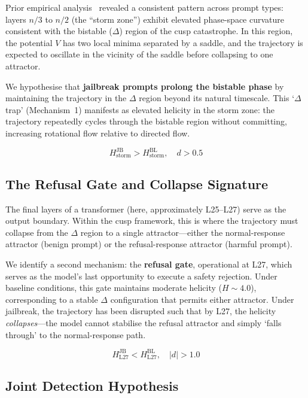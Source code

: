 \documentclass[12pt,a4paper]{article}
\begin{document}
Prior empirical analysis~\cite{DR_MM_2025b} revealed a consistent pattern across prompt types: layers $n/3$ to $n/2$ (the ``storm zone'') exhibit elevated phase-space curvature consistent with the bistable ($\Delta$) region of the cusp catastrophe. In this region, the potential $V$ has two local minima separated by a saddle, and the trajectory is expected to oscillate in the vicinity of the saddle before collapsing to one attractor.

We hypothesise that \textbf{jailbreak prompts prolong the bistable phase} by maintaining the trajectory in the $\Delta$ region beyond its natural timescale. This `$\Delta$ trap' (Mechanism~1) manifests as elevated helicity in the storm zone: the trajectory repeatedly cycles through the bistable region without committing, increasing rotational flow relative to directed flow.

\begin{equation}
    H_{\text{storm}}^{\text{JB}} > H_{\text{storm}}^{\text{BL}}, \quad d > 0.5
    \label{eq:storm}
\end{equation}

\subsection{The Refusal Gate and Collapse Signature}

The final layers of a transformer (here, approximately L25--L27) serve as the output boundary. Within the cusp framework, this is where the trajectory must collapse from the $\Delta$ region to a single attractor---either the normal-response attractor (benign prompt) or the refusal-response attractor (harmful prompt).

We identify a second mechanism: the \textbf{refusal gate}, operational at L27, which serves as the model's last opportunity to execute a safety rejection. Under baseline conditions, this gate maintains moderate helicity ($H \sim 4.0$), corresponding to a stable $\Delta$ configuration that permits either attractor. Under jailbreak, the trajectory has been disrupted such that by L27, the helicity \textit{collapses}---the model cannot stabilise the refusal attractor and simply `falls through' to the normal-response path.

\begin{equation}
    H_{\text{L27}}^{\text{JB}} < H_{\text{L27}}^{\text{BL}}, \quad |d| > 1.0
    \label{eq:collapse}
\end{equation}

\subsection{Joint Detection Hypothesis}
\end{document}
